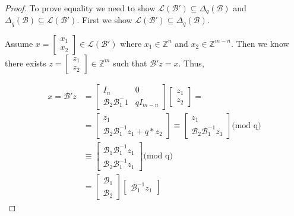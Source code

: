\documentclass[11pt]{article}
\theoremstyle{definition}
\theoremstyle{plain}
\theoremstyle{remark}
\newcommand{\LL}{\mathcal{L}}
\newcommand{\cB}{\mathcal{B}}
\newcommand{\bZ}{\mathbb{Z}}
\begin{document}
\begin{proof}
To prove equality we need to show $\LL(\cB') \subseteq \Delta_q(\cB)$ and $\Delta_q(\cB) \subseteq \LL(\cB')$. First we show  $\LL(\cB') \subseteq \Delta_q(\cB)$.

Assume $x =  \begin{bmatrix}x_1 \\ x_2 \end{bmatrix} \in \LL(\cB')$ where $x_1 \in \bZ^n$ and $x_2 \in \bZ^{m-n}$. Then we know there exists $z = \begin{bmatrix}z_1 \\ z_2 \end{bmatrix} \in \bZ^m$ such that $\cB' z = x$. Thus,

\begin{align*}
    x = \cB' z &= \begin{bmatrix}
I_n & 0\\
\cB_2\cB_1^-1 & qI_{m-n} 
\end{bmatrix}
\begin{bmatrix}
z_1\\
z_2
\end{bmatrix}
= \\
&= \begin{bmatrix}
z_1\\
\cB_2\cB_1^{-1}z_1 + q*z_2 
\end{bmatrix}
\equiv
\begin{bmatrix}
z_1\\
\cB_2\cB_1^{-1}z_1
\end{bmatrix}
\text{(mod q)} \\
&\equiv
\begin{bmatrix}
\cB_1\cB_1^{-1}z_1\\
\cB_2\cB_1^{-1}z_1
\end{bmatrix}
\text{(mod q)} \\
&=
\begin{bmatrix}
\cB_1\\
\cB_2
\end{bmatrix}
\begin{bmatrix}
\cB_1^{-1}z_1
\end{bmatrix}
\end{align*}


\end{proof}
\end{document}
